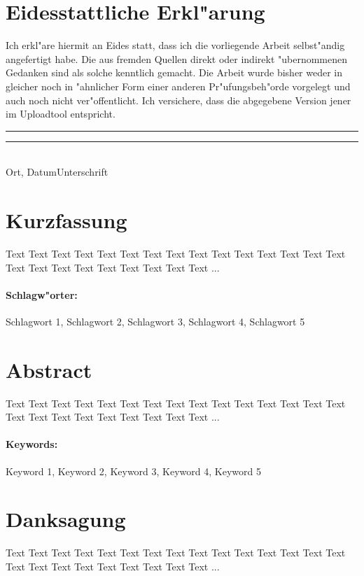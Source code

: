 \documentclass[a4paper,bibtotoc,oneside]{scrbook}
\begin{document}
\newpage


\section*{Eidesstattliche Erkl"arung}\thispagestyle{empty}
\glqq Ich erkl"are hiermit an Eides statt, dass ich die vorliegende Arbeit selbst"andig angefertigt habe. 
Die aus fremden Quellen direkt oder indirekt "ubernommenen Gedanken sind als solche kenntlich gemacht. 
Die Arbeit wurde bisher weder in gleicher noch in "ahnlicher Form einer anderen Pr"ufungsbeh"orde vorgelegt
und auch noch nicht ver"offentlicht. Ich versichere, dass die abgegebene Version jener im Uploadtool entspricht.\grqq\\[5\baselineskip]
\rule{5cm}{0.2pt}\hfill\rule{5cm}{0.2pt}\\
\phantom{Datum }Ort, Datum\hfill Unterschrift\hspace{15mm}

\newpage

\section*{Kurzfassung}\thispagestyle{empty}
Text Text Text Text Text Text Text Text Text Text Text Text Text Text Text Text Text Text Text Text Text Text Text Text ...
\\ \vfill
\paragraph*{Schlagw"orter:} Schlagwort 1, Schlagwort 2, Schlagwort 3, Schlagwort 4, Schlagwort 5

\newpage

\section*{Abstract}\thispagestyle{empty}
Text Text Text Text Text Text Text Text Text Text Text Text Text Text Text Text Text Text Text Text Text Text Text Text ...
\\ \vfill
\paragraph*{Keywords:} Keyword 1, Keyword 2, Keyword 3, Keyword 4, Keyword 5
\newpage

\section*{Danksagung}
\thispagestyle{empty}
Text Text Text Text Text Text Text Text Text Text Text Text Text Text Text Text Text Text Text Text Text Text Text Text ...
\newpage
\end{document}
